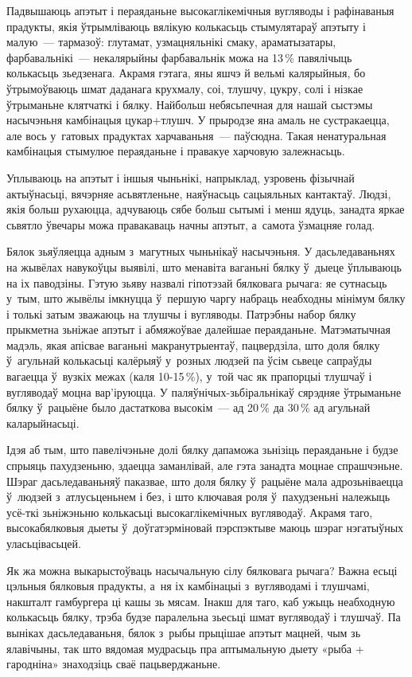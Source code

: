 Падвышаюць апэтыт і пераяданьне высокаглікемічныя вугляводы і рафінаваныя прадукты, якія ўтрымліваюць вялікую колькасьць стымулятараў апэтыту і малую~--- тармазоў: глутамат, узмацняльнікі смаку, араматызатары, фарбавальнікі~--- некалярыйны фарбавальнік можа на 13\,\% павялічыць колькасьць зьедзенага. Акрамя гэтага, яны яшчэ й вельмі калярыйныя, бо ўтрымоўваюць шмат даданага крухмалу, соі, тлушчу, цукру, солі і нізкае ўтрыманьне клятчаткі і бялку. Найбольш небясьпечная для нашай сыстэмы насычэньня камбінацыя цукар+тлушч. У прыродзе яна амаль не сустракаецца, але вось у~гатовых прадуктах харчаваньня~--- паўсюдна. Такая ненатуральная камбінацыя стымулюе пераяданьне і правакуе харчовую залежнасьць.

Уплываюць на апэтыт і іншыя чыньнікі, напрыклад, узровень фізычнай актыўнасьці, вячэрняе асьвятленьне, наяўнасьць сацыяльных кантактаў. Людзі, якія больш рухаюцца, адчуваюць сябе больш сытымі і менш ядуць, занадта яркае сьвятло ўвечары можа правакаваць начны апэтыт, а~самота ўзмацняе голад.

Бялок зьяўляецца адным з~магутных чыньнікаў насычэньня. У дасьледаваньнях на жывёлах навукоўцы выявілі, што менавіта ваганьні бялку ў~дыеце ўплываюць на іх паводзіны. Гэтую зьяву назвалі гіпотэзай бялковага рычага: яе сутнасьць у~тым, што жывёлы імкнуцца ў~першую чаргу набраць неабходны мінімум бялку і толькі затым зважаюць на тлушчы і вугляводы. Патрэбны набор бялку прыкметна зьніжае апэтыт і абмяжоўвае далейшае пераяданьне. Матэматычная мадэль, якая апісвае ваганьні макранутрыентаў, пацвердзіла, што доля бялку ў~агульнай колькасьці калёрыяў у~розных людзей па ўсім сьвеце сапраўды вагаецца ў~вузкіх межах (каля 10-15\,\%), у~той час як прапорцыі тлушчаў і вугляводаў моцна вар'іруюцца. У паляўнічых-зьбіральнікаў сярэдняе ўтрыманьне бялку ў~рацыёне было дастаткова высокім~--- ад 20\,\% да 30\,\% ад агульнай каларыйнасьці.

Ідэя аб тым, што павелічэньне долі бялку дапаможа зьнізіць пераяданьне і будзе спрыяць пахудзеньню, здаецца заманлівай, але гэта занадта моцнае спрашчэньне. Шэраг дасьледаваньняў паказвае, што доля бялку ў~рацыёне мала адрозьніваецца ў~людзей з~атлусьценьнем і без, і што ключавая роля ў~пахудзеньні належыць усё-ткі зьніжэньню колькасьці высокаглікемічных вугляводаў. Акрамя таго, высокабялковыя дыеты ў~доўгатэрміновай пэрспэктыве маюць шэраг нэгатыўных уласьцівасьцей.

Як жа можна выкарыстоўваць насычальную сілу бялковага рычага? Важна есьці цэльныя бялковыя прадукты, а~ня іх камбінацыі з~вугляводамі і тлушчамі, накшталт гамбургера ці кашы зь мясам. Інакш для таго, каб ужыць неабходную колькасьць бялку, трэба будзе паралельна зьесьці шмат вугляводаў і тлушчаў. Па выніках дасьледаваньня, бялок з~рыбы прыцішае апэтыт мацней, чым зь ялавічыны, так што вядомая мудрасьць пра аптымальную дыету «рыба + гародніна» знаходзіць сваё пацьверджаньне.

